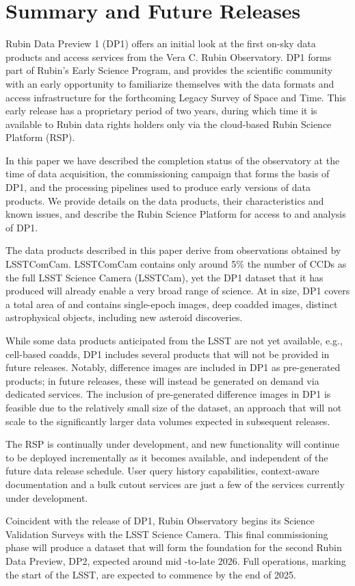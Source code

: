 \section{Summary and Future Releases}
\label{sec:summary}

Rubin Data Preview 1 (\gls{DP1}) offers an initial look at the first on-sky data products and access services from the Vera C. Rubin Observatory. \gls{DP1} forms part of Rubin's Early Science Program, and provides the scientific community with an early opportunity to familiarize themselves with the data formats and access infrastructure for the forthcoming Legacy Survey of Space and Time.
This early release has a proprietary period of two years, during which time it is  available to Rubin data rights holders only via the cloud-based Rubin Science Platform (\gls{RSP}).

In this paper we have described the completion status of the observatory at the time of data acquisition, the commissioning campaign that forms the basis of \gls{DP1}, and the processing pipelines used to produce early versions of data products.
We provide details on the data products, their characteristics and known issues, and describe the Rubin Science Platform for access to and analysis of DP1.

The data products described in this paper derive from observations obtained by \gls{LSSTComCam}. \gls{LSSTComCam} contains only around 5\% the number of CCDs as the full LSST Science Camera (LSSTCam), yet the DP1 dataset that it has produced will already enable a very broad range of science.
At \sizeinbytes in size, DP1 covers a total area of \totalarea and contains \nexposures single-\gls{epoch} images, \ndeepcoadds deep coadded images, \nobjects distinct astrophysical objects, including  \nnewasteroiddiscoveries  new asteroid discoveries.

While some data products anticipated from the LSST are not yet available, e.g., cell-based coadds, DP1 includes several products that will not be provided in future releases.
Notably, difference images are included in DP1 as pre-generated products; in future releases, these will instead be generated on demand via dedicated services.
The inclusion of pre-generated difference images in DP1 is feasible due to the relatively small size of the dataset, an approach that will not scale to the significantly larger data volumes expected in subsequent releases.

The \gls{RSP} is continually under development, and new functionality will continue to be deployed incrementally as it becomes available, and independent of the future data release schedule.
User query history capabilities, context-aware documentation and a bulk cutout services are just a few of the services currently under development.

Coincident with the release of DP1, Rubin Observatory begins its Science Validation Surveys with the LSST Science Camera.
This final commissioning phase will produce a dataset that will form the foundation for the second Rubin Data Preview, \gls{DP2}, expected around mid -to-late 2026.
Full operations, marking the start of the \gls{LSST}, are expected to commence by the end of 2025.
